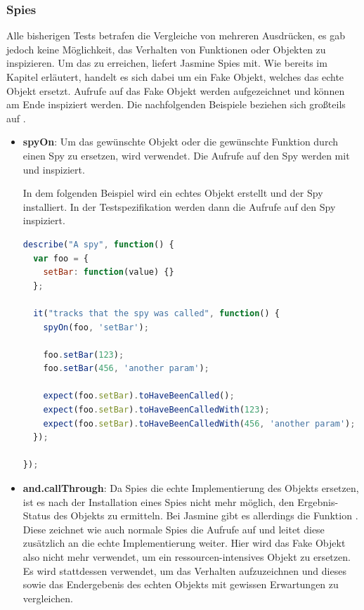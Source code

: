 \subsubsection{Spies}
Alle bisherigen Tests betrafen die Vergleiche von mehreren Ausdrücken, es gab jedoch keine Möglichkeit, das Verhalten von Funktionen oder Objekten zu inspizieren. Um das zu erreichen, liefert Jasmine Spies mit. Wie bereits im Kapitel  erläutert, handelt es sich dabei um ein Fake Objekt, welches das echte Objekt ersetzt. Aufrufe auf das Fake Objekt werden aufgezeichnet und können am Ende inspiziert werden. Die nachfolgenden Beispiele beziehen sich großteils auf \cite{Jasmine}.

\begin{itemize}
  \item \textbf{spyOn}: \newline
  Um das gewünschte Objekt oder die gewünschte Funktion durch einen Spy zu ersetzen, wird  verwendet. Die Aufrufe auf den Spy werden mit  und  inspiziert.

  In dem folgenden Beispiel wird ein echtes Objekt erstellt und der Spy installiert. In der Testspezifikation werden dann die Aufrufe auf den Spy inspiziert.

  \begin{lstlisting}[language=JavaScript]
describe("A spy", function() {
  var foo = {
    setBar: function(value) {}
  };
    
  it("tracks that the spy was called", function() {
    spyOn(foo, 'setBar');

    foo.setBar(123);
    foo.setBar(456, 'another param');

    expect(foo.setBar).toHaveBeenCalled();
    expect(foo.setBar).toHaveBeenCalledWith(123);
    expect(foo.setBar).toHaveBeenCalledWith(456, 'another param');
  });

});
  \end{lstlisting}

  \item \textbf{and.callThrough}: \newline
  Da Spies die echte Implementierung des Objekts ersetzen, ist es nach der Installation eines Spies nicht mehr möglich, den Ergebnis-Status des Objekts zu ermitteln. Bei Jasmine gibt es allerdings die Funktion . Diese zeichnet wie auch normale Spies die Aufrufe auf und leitet diese zusätzlich an die echte Implementierung weiter. Hier wird das Fake Objekt also nicht mehr verwendet, um ein ressourcen-intensives Objekt zu ersetzen. Es wird stattdessen verwendet, um das Verhalten aufzuzeichnen und dieses sowie das Endergebenis des echten Objekts mit gewissen Erwartungen zu vergleichen.


\end{itemize}
